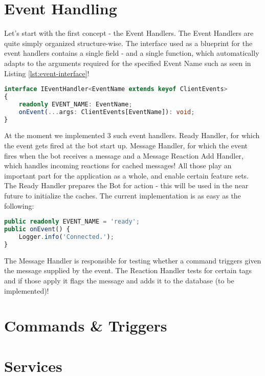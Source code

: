 \documentclass[12pt,oneside]{book}
\begin{document}
\chapter[Events]{Event Handling}
    Let's start with the first concept - the Event Handlers. The Event Handlers
    are quite simply organized structure-wise. The interface used as a blueprint
    for the event handlers contains a single field -  and a 
    single  function, which automatically adapts to the arguments
    required for the specified Event Name such as seen in Listing 
    \ref{lst:event-interface}!\\
    \begin{minipage}{\linewidth}
        \begin{lstlisting}[language=TypeScript, caption=Event Handler Interface, 
        label=lst:event-interface]
interface IEventHandler<EventName extends keyof ClientEvents> 
{
    readonly EVENT_NAME: EventName;
    onEvent(...args: ClientEvents[EventName]): void;
}
        \end{lstlisting}
    \end{minipage}
    At the moment we implemented 3 such event handlers. Ready Handler, for which
    the event gets fired at the bot start up. Message Handler, for which the 
    event fires when the bot receives a message and a Message Reaction Add Handler,
    which handles incoming reactions for cached messages! All those play an important
    part for the application as a whole, and enable certain feature sets.\\
    The Ready Handler prepares the Bot for action - this will be used in the near 
    future to initialize the caches. The current implementation is as easy as the
    following:\\
    \begin{minipage}{\linewidth}
        \begin{lstlisting}[language=TypeScript, caption=Ready Handler, label=lst:ready-handler]
public readonly EVENT_NAME = 'ready';
public onEvent() {
    Logger.info('Connected.');
}
        \end{lstlisting} 
    \end{minipage}
    The Message Handler is responsible for 
    testing whether a command triggers given the message supplied by the event.
    The Reaction Handler tests for certain tags and if those apply it flags the message
    and adds it to the database (to be implemented)!


\chapter[Commands]{Commands \& Triggers}

\chapter[Services]{Services}
\end{document}
